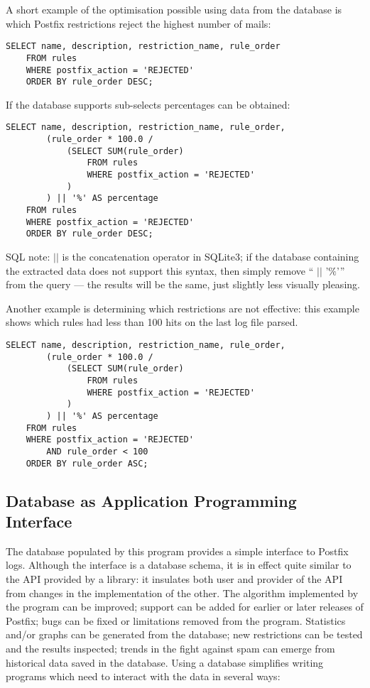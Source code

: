 \documentclass[a4paper,12pt,draft]{article}
\begin{document}
A short example of the optimisation possible using data from the database
is which Postfix restrictions reject the highest number of mails:

\begin{verbatim}
SELECT name, description, restriction_name, rule_order
    FROM rules
    WHERE postfix_action = 'REJECTED'
    ORDER BY rule_order DESC;
\end{verbatim}

If the database supports sub-selects percentages can be
obtained:

\begin{verbatim}
SELECT name, description, restriction_name, rule_order,
        (rule_order * 100.0 /
            (SELECT SUM(rule_order)
                FROM rules
                WHERE postfix_action = 'REJECTED'
            )
        ) || '%' AS percentage
    FROM rules
    WHERE postfix_action = 'REJECTED'
    ORDER BY rule_order DESC;
\end{verbatim}

SQL note: $||$ is the concatenation operator in SQLite3; if the database
containing the extracted data does not support this syntax, then simply
remove `` $||$ '$\%$'\hspace{1ex}'' from the query --- the results will be
the same, just slightly less visually pleasing.

Another example is determining which restrictions are not effective: this
example shows which rules had less than 100 hits on the last log file
parsed.

\begin{verbatim}
SELECT name, description, restriction_name, rule_order,
        (rule_order * 100.0 /
            (SELECT SUM(rule_order)
                FROM rules
                WHERE postfix_action = 'REJECTED'
            )
        ) || '%' AS percentage
    FROM rules
    WHERE postfix_action = 'REJECTED'
        AND rule_order < 100
    ORDER BY rule_order ASC;
\end{verbatim}

\subsection{Database as Application Programming Interface}

The database populated by this program provides a simple interface to
Postfix logs.  Although the interface is a database schema, it is in effect
quite similar to the API provided by a library: it insulates both user and
provider of the API from changes in the implementation of the other.  The
algorithm implemented by the program can be improved; support can be added
for earlier or later releases of Postfix; bugs can be fixed or limitations
removed from the program.  Statistics and/or graphs can be generated from
the database; new restrictions can be tested and the results inspected;
trends in the fight against spam can emerge from historical data saved in
the database.  Using a database simplifies writing programs which need to
interact with the data in several ways:
\end{document}
